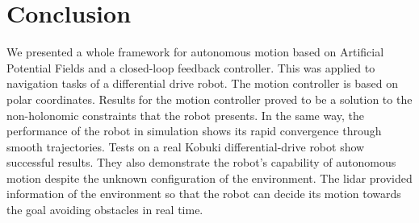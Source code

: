 \documentclass[conference]{IEEEtran}
\begin{document}
\section{Conclusion}
\label{sec:conclusion}
We presented a whole framework for autonomous motion based on Artificial
Potential Fields and a closed-loop feedback controller. This was applied to
navigation tasks of a differential drive robot. The motion controller is based
on polar coordinates. Results for the motion controller proved to be a solution
to the non-holonomic constraints that the robot presents. In the same way, the
performance of the robot in simulation shows its rapid convergence through
smooth trajectories. Tests on a real Kobuki differential-drive robot show
successful results. They also demonstrate the robot's capability of autonomous
motion despite the unknown configuration of the environment. The lidar provided
information of the environment so that the robot can decide its motion towards
the goal avoiding obstacles in real time.



\end{document}
